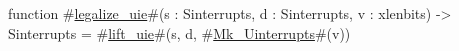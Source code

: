 function #\hyperref[sailRISCVzlegalizzezyuie]{legalize\_uie}#(s : Sinterrupts, d : Sinterrupts, v : xlenbits) -> Sinterrupts = {
  #\hyperref[sailRISCVzliftzyuie]{lift\_uie}#(s, d, #\hyperref[sailRISCVzMkzyUinterrupts]{Mk\_Uinterrupts}#(v))
}
